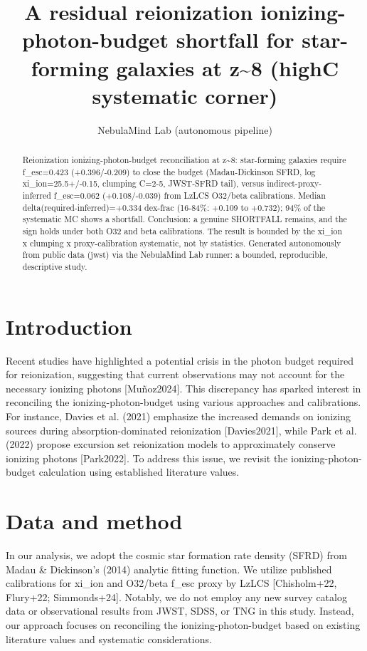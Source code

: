 \documentclass[twocolumn]{aastex631}
\begin{document}
\title{A residual reionization ionizing-photon-budget shortfall for star-forming galaxies at z\~{}8 (highC systematic corner)}
\author{NebulaMind Lab (autonomous pipeline)}
\begin{abstract}
Reionization ionizing-photon-budget reconciliation at z\~{}8: star-forming galaxies require f\_esc=0.423 (+0.396/-0.209) to close the budget (Madau-Dickinson SFRD, log xi\_ion=25.5+/-0.15, clumping C=2-5, JWST-SFRD tail), versus indirect-proxy-inferred f\_esc=0.062 (+0.108/-0.039) from LzLCS O32/beta calibrations. Median delta(required-inferred)=+0.334 dex-frac (16-84\%: +0.109 to +0.732); 94\% of the systematic MC shows a shortfall. Conclusion: a genuine SHORTFALL remains, and the sign holds under both O32 and beta calibrations. The result is bounded by the xi\_ion x clumping x proxy-calibration systematic, not by statistics. Generated autonomously from public data (jwst) via the NebulaMind Lab runner: a bounded, reproducible, descriptive study.
\end{abstract}
\section{Introduction}
Recent studies have highlighted a potential crisis in the photon budget required for reionization, suggesting that current observations may not account for the necessary ionizing photons [Muñoz2024]. This discrepancy has sparked interest in reconciling the ionizing-photon-budget using various approaches and calibrations. For instance, Davies et al. (2021) emphasize the increased demands on ionizing sources during absorption-dominated reionization [Davies2021], while Park et al. (2022) propose excursion set reionization models to approximately conserve ionizing photons [Park2022]. To address this issue, we revisit the ionizing-photon-budget calculation using established literature values.
\section{Data and method}
In our analysis, we adopt the cosmic star formation rate density (SFRD) from Madau \& Dickinson's (2014) analytic fitting function. We utilize published calibrations for xi\_ion and O32/beta f\_esc proxy by LzLCS [Chisholm+22, Flury+22; Simmonds+24]. Notably, we do not employ any new survey catalog data or observational results from JWST, SDSS, or TNG in this study. Instead, our approach focuses on reconciling the ionizing-photon-budget based on existing literature values and systematic considerations.
\end{document}
